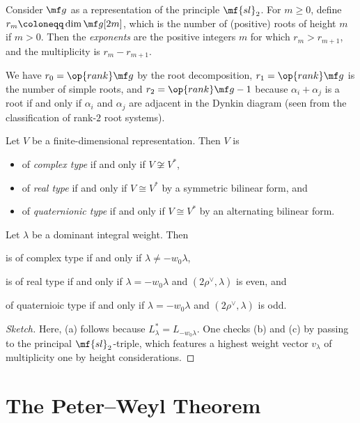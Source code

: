 \documentclass{article}
\begin{document}
\begin{definition}[exponents]
	Consider $\mf g$ as a representation of the principle $\mf{sl}_2$. For $m\ge0$, define $r_m\coloneqq\dim\mf g[2m]$, which is the number of (positive) roots of height $m$ if $m>0$. Then the \textit{exponents} are the positive integers $m$ for which $r_m>r_{m+1}$, and the multiplicity is $r_m-r_{m+1}$.
\end{definition}
\begin{example}
	We have $r_0=\op{rank}\mf g$ by the root decomposition, $r_1=\op{rank}\mf g$ is the number of simple roots, and $r_2=\op{rank}\mf g-1$ because $\alpha_i+\alpha_j$ is a root if and only if $\alpha_i$ and $\alpha_j$ are adjacent in the Dynkin diagram (seen from the classification of rank-$2$ root systems).
\end{example}
\begin{definition}[type]
	Let $V$ be a finite-dimensional representation. Then $V$ is
	\begin{itemize}
		\item of \textit{complex type} if and only if $V\not\cong V^*$,
		\item of \textit{real type} if and only if $V\cong V^*$ by a symmetric bilinear form, and
		\item of \textit{quaternionic type} if and only if $V\cong V^*$ by an alternating bilinear form.
	\end{itemize}
\end{definition}
\begin{proposition}
	Let $\lambda$ be a dominant integral weight. Then
	\begin{listalph}
		\item is of complex type if and only if $\lambda\ne-w_0\lambda$,
		\item is of real type if and only if $\lambda=-w_0\lambda$ and $(2\rho^\lor,\lambda)$ is even, and
		\item of quaternioic type if and only if $\lambda=-w_0\lambda$ and $(2\rho^\lor,\lambda)$ is odd.
	\end{listalph}
\end{proposition}
\begin{proof}[Sketch]
	Here, (a) follows because $L_\lambda^*=L_{-w_0\lambda}$. One checks (b) and (c) by passing to the principal $\mf{sl}_2$-triple, which features a highest weight vector $v_\lambda$ of multiplicity one by height considerations.
\end{proof}

\section{The Peter--Weyl Theorem}
\end{document}
